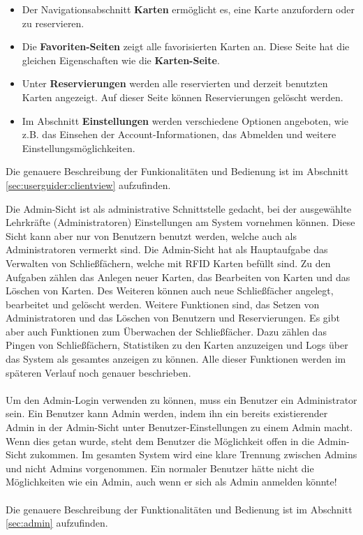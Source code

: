 \begin{itemize}
    \item Der Navigationsabschnitt \textbf{Karten} ermöglicht es, eine Karte anzufordern oder zu reservieren.

    \item Die \textbf{Favoriten-Seiten} zeigt alle favorisierten Karten an. Diese Seite hat die gleichen Eigenschaften wie die \textbf{Karten-Seite}.

    \item Unter \textbf{Reservierungen} werden alle reservierten und derzeit benutzten Karten angezeigt. Auf dieser Seite können Reservierungen gelöscht werden.

    \item Im Abschnitt \textbf{Einstellungen} werden verschiedene Optionen angeboten, wie z.B. das Einsehen der Account-Informationen, das Abmelden und weitere Einstellungsmöglichkeiten.
\end{itemize}
 Die genauere Beschreibung der Funkionalit\"aten und Bedienung ist im Abschnitt \ref{sec:userguider:clientview} aufzufinden.

\newpage
 
 \label{subsec:thero:admin}

Die Admin-Sicht ist als administrative Schnittstelle gedacht, bei der ausgewählte Lehrkräfte (Administratoren) Einstellungen am System vornehmen können. Diese Sicht kann aber nur von Benutzern benutzt werden, welche auch als Administratoren vermerkt sind. Die Admin-Sicht hat als Hauptaufgabe das Verwalten von Schließfächern, welche mit RFID Karten befüllt sind. Zu den Aufgaben zählen das Anlegen neuer Karten, das Bearbeiten von Karten und das Löschen von Karten. Des Weiteren können auch neue Schließfächer angelegt, bearbeitet und gelöscht werden. Weitere Funktionen sind, das Setzen von Administratoren und das Löschen von Benutzern und Reservierungen. Es gibt aber auch Funktionen zum Überwachen der Schließfächer. Dazu zählen das Pingen von Schließfächern, Statistiken zu den Karten anzuzeigen und Logs über das System als gesamtes anzeigen zu können. Alle dieser Funktionen werden im späteren Verlauf noch genauer beschrieben.\\
\\Um den Admin-Login verwenden zu können, muss ein Benutzer ein Administrator sein. Ein Benutzer kann Admin werden, indem ihn ein bereits existierender Admin in der Admin-Sicht unter Benutzer-Einstellungen zu einem Admin macht. Wenn dies getan wurde, steht dem Benutzer die Möglichkeit offen in die Admin-Sicht zukommen. Im gesamten System wird eine klare Trennung zwischen Admins und nicht Admins vorgenommen. Ein normaler Benutzer hätte nicht die Möglichkeiten wie ein Admin, auch wenn er sich als Admin anmelden könnte!\\
 \\ Die genauere Beschreibung der Funktionalitäten und Bedienung ist im Abschnitt \ref{sec:admin} aufzufinden.

